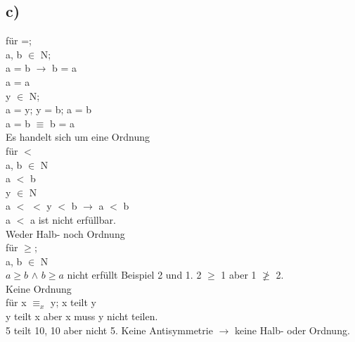 \documentclass{article}
\begin{document}
	\subsection*{c)}
	für =; \\
	a, b $\in$ N; \\
	a = b $\to$ b = a \\
	a = a \\
	y $\in$ N; \\
	a = y; y = b; a = b \\
	a = b $\equiv$ b = a \\
	Es handelt sich um eine Ordnung \\
	für $<$ \\
	a, b $\in$ N \\
	a $<$ b \\
	y $\in$ N \\
	a $<$ $<$ y $<$ b $\to$ a $<$ b \\
	a $<$ a ist nicht erfüllbar. \\
	Weder Halb- noch Ordnung \\
	für $\geq$; \\
	a, b $\in$ N \\
	$a \geq b$ $\land$ $b \geq a$ nicht erfüllt Beispiel 2 und 1. 2 $\ge$ 1 aber 1 $\not\geq$ 2.\\
	Keine Ordnung \\
	für x $\equiv_x$ y; x teilt y \\
	y teilt x aber x muss y nicht teilen. \\
	5 teilt 10, 10 aber nicht 5. Keine Antisymmetrie $\to$ keine Halb- oder Ordnung.
	
\end{document}
